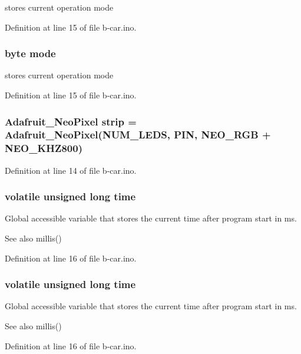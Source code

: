 stores current operation mode 



Definition at line 15 of file b-\/car.\+ino.

\subsubsection[{\texorpdfstring{mode}{mode}}]{\setlength{\rightskip}{0pt plus 5cm}byte mode}\hypertarget{group__main_ga988166baebc4b27bd18de27cd40f8b5a}{}\label{group__main_ga988166baebc4b27bd18de27cd40f8b5a}


stores current operation mode 



Definition at line 15 of file b-\/car.\+ino.

\subsubsection[{\texorpdfstring{strip}{strip}}]{\setlength{\rightskip}{0pt plus 5cm}Adafruit\+\_\+\+Neo\+Pixel strip = Adafruit\+\_\+\+Neo\+Pixel({\bf N\+U\+M\+\_\+\+L\+E\+DS}, {\bf P\+IN}, N\+E\+O\+\_\+\+R\+GB + N\+E\+O\+\_\+\+K\+H\+Z800)}\hypertarget{group__main_gacf2771bd8bfaf855bbcc6c30301bf380}{}\label{group__main_gacf2771bd8bfaf855bbcc6c30301bf380}


Definition at line 14 of file b-\/car.\+ino.

\subsubsection[{\texorpdfstring{time}{time}}]{\setlength{\rightskip}{0pt plus 5cm}volatile unsigned long time}\hypertarget{group__main_ga4f944bfefd58754546ebcc7c5143442c}{}\label{group__main_ga4f944bfefd58754546ebcc7c5143442c}


Global accessible variable that stores the current time after program start in ms. 

\begin{DoxySeeAlso}{See also}
millis() 
\end{DoxySeeAlso}


Definition at line 16 of file b-\/car.\+ino.

\subsubsection[{\texorpdfstring{time}{time}}]{\setlength{\rightskip}{0pt plus 5cm}volatile unsigned long time}\hypertarget{group__main_ga4f944bfefd58754546ebcc7c5143442c}{}\label{group__main_ga4f944bfefd58754546ebcc7c5143442c}


Global accessible variable that stores the current time after program start in ms. 

\begin{DoxySeeAlso}{See also}
millis() 
\end{DoxySeeAlso}


Definition at line 16 of file b-\/car.\+ino.

